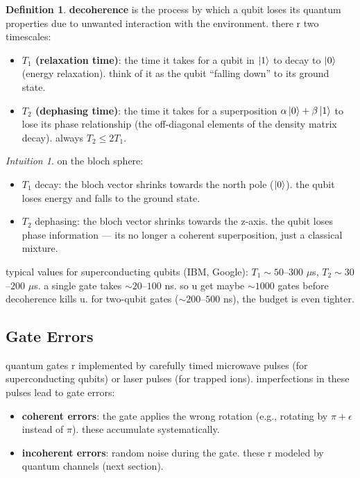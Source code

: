 \documentclass[11pt,a4paper]{article}
\theoremstyle{definition}
\newtheorem{definition}{Definition}[section]
\theoremstyle{remark}
\newtheorem*{intuition}{Intuition}
\begin{document}
\begin{definition}
\textbf{decoherence} is the process by which a qubit loses its quantum properties due to unwanted interaction with the environment. there r two timescales:
\begin{itemize}
    \item \textbf{$T_1$ (relaxation time)}: the time it takes for a qubit in $\ket{1}$ to decay to $\ket{0}$ (energy relaxation). think of it as the qubit ``falling down'' to its ground state.
    \item \textbf{$T_2$ (dephasing time)}: the time it takes for a superposition $\alpha\ket{0} + \beta\ket{1}$ to lose its phase relationship (the off-diagonal elements of the density matrix decay). always $T_2 \leq 2T_1$.
\end{itemize}
\end{definition}

\begin{intuition}
on the bloch sphere:
\begin{itemize}
    \item $T_1$ decay: the bloch vector shrinks towards the north pole ($\ket{0}$). the qubit loses energy and falls to the ground state.
    \item $T_2$ dephasing: the bloch vector shrinks towards the z-axis. the qubit loses phase information --- its no longer a coherent superposition, just a classical mixture.
\end{itemize}

typical values for superconducting qubits (IBM, Google): $T_1 \sim 50$--$300$ $\mu$s, $T_2 \sim 30$--$200$ $\mu$s. a single gate takes $\sim 20$--$100$ ns. so u get maybe $\sim 1000$ gates before decoherence kills u. for two-qubit gates ($\sim 200$--$500$ ns), the budget is even tighter.
\end{intuition}

\subsection{Gate Errors}

quantum gates r implemented by carefully timed microwave pulses (for superconducting qubits) or laser pulses (for trapped ions). imperfections in these pulses lead to gate errors:

\begin{itemize}
    \item \textbf{coherent errors}: the gate applies the wrong rotation (e.g., rotating by $\pi + \epsilon$ instead of $\pi$). these accumulate systematically.
    \item \textbf{incoherent errors}: random noise during the gate. these r modeled by quantum channels (next section).
\end{itemize}
\end{document}
